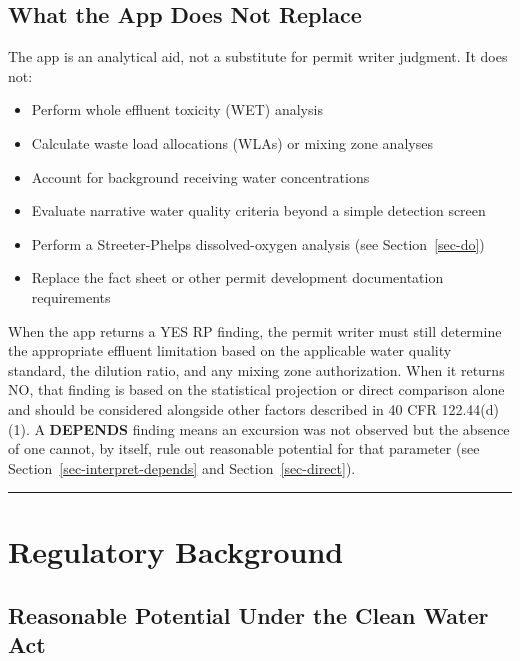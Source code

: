 \documentclass[
  11pt,
  letterpaper,
  DIV=11,
  numbers=noendperiod]{scrartcl}
\providecommand{\tightlist}{%
  \setlength{\itemsep}{0pt}\setlength{\parskip}{0pt}}
\begin{document}
\subsection{What the App Does Not Replace}\label{sec-limitations}

The app is an analytical aid, not a substitute for permit writer
judgment. It does not:

\begin{itemize}
\tightlist
\item
  Perform whole effluent toxicity (WET) analysis
\item
  Calculate waste load allocations (WLAs) or mixing zone analyses
\item
  Account for background receiving water concentrations
\item
  Evaluate narrative water quality criteria beyond a simple detection
  screen
\item
  Perform a Streeter-Phelps dissolved-oxygen analysis (see
  Section~\ref{sec-do})
\item
  Replace the fact sheet or other permit development documentation
  requirements
\end{itemize}

When the app returns a YES RP finding, the permit writer must still
determine the appropriate effluent limitation based on the applicable
water quality standard, the dilution ratio, and any mixing zone
authorization. When it returns NO, that finding is based on the
statistical projection or direct comparison alone and should be
considered alongside other factors described in 40 CFR 122.44(d)(1). A
\textbf{DEPENDS} finding means an excursion was not observed but the
absence of one cannot, by itself, rule out reasonable potential for that
parameter (see Section~\ref{sec-interpret-depends} and
Section~\ref{sec-direct}).

\begin{center}\rule{0.5\linewidth}{0.5pt}\end{center}

\section{Regulatory Background}\label{sec-background}

\subsection{Reasonable Potential Under the Clean Water
Act}\label{sec-rp-background}
\end{document}
